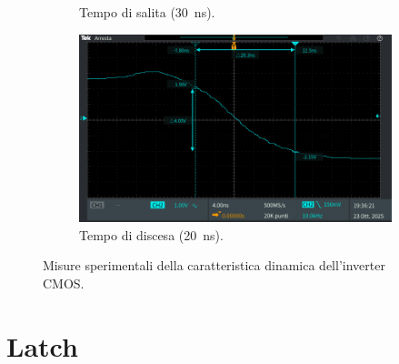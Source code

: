 \documentclass[a4paper,12pt]{article}
\begin{document}
\begin{figure}[H]
\begin{subfigure}[b]{0.48\textwidth}
        \caption{Tempo di salita (\SI{30}{\nano\second}).}
        \label{fig:salita}
    \end{subfigure}
    \hfill
    \begin{subfigure}[b]{0.48\textwidth}
        \centering
        \includegraphics[width=\linewidth]{immagini/inverter/TEK00103.PNG}
        \caption{Tempo di discesa (\SI{20}{\nano\second}).}
        \label{fig:discesa}
    \end{subfigure}
    \caption{Misure sperimentali della caratteristica dinamica dell'inverter CMOS.}
    \label{fig:dinamica_misure}
\end{figure}

\section{Latch}
\end{document}
